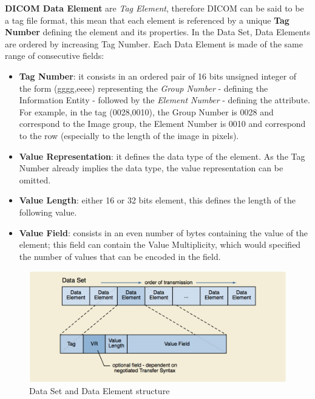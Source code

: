 \newline \vspace{5mm}
\textbf{DICOM Data Element} are \textit{Tag Element}, therefore DICOM can be said to be a tag file format, this mean that each element is referenced by a unique \textbf{Tag Number} defining the element and its properties. In the Data Set, Data Elements are ordered by increasing Tag Number. Each Data Element is made of the same range of consecutive fields: 
\begin{itemize} 
\item \textbf{Tag Number}: it consists in an ordered pair of 16 bits unsigned integer of the form (gggg,eeee)  representing the \textit{Group Number} - defining the Information Entity - followed by the \textit{Element Number} - defining the attribute. For example, in the tag (0028,0010), the Group Number is 0028 and correspond to the Image group, the Element Number is 0010 and correspond to the row (especially to the length of the image in pixels).
\item \textbf{Value Representation}: it defines the data type of the element. As the Tag Number already implies the data type, the value representation can be omitted.
\item \textbf{Value Length}: either 16 or 32 bits element, this defines the length of the following value.
\item \textbf{Value Field}: consists in an even number of bytes containing the value of the element; this field can contain the Value Multiplicity, which would specified the number of values that can be encoded in the field. 
\end{itemize}

\begin{figure}[ht]
\centering
\includegraphics[width = 0.8\hsize]{./figures/DataSetandDataElement}
\caption{Data Set and Data Element structure}
\end{figure} 

